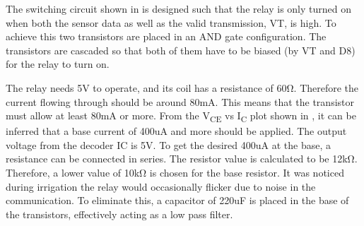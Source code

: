 \vspace*{10pt}
The switching circuit shown in  is designed such that the relay is only turned on when both the sensor data as well as the valid transmission, VT, is high. To achieve this two transistors are placed in an AND gate configuration. The transistors are cascaded so that both of them have to be biased (by VT and D8) for the relay to turn on.
\vspace*{10pt}



The relay needs 5V to operate, and its coil has a resistance of 60Ω. Therefore the current flowing through should be around 80mA. This means that the transistor must allow at least 80mA or more. From the V\textsubscript{CE} vs I\textsubscript{C} plot shown in , it can be inferred that a base current of 400uA and more should be applied. The output voltage from the decoder IC is 5V. To get the desired 400uA at the base, a resistance can be connected in series. The resistor value is calculated to be 12kΩ. Therefore, a lower value of 10kΩ is chosen for the base resistor. It was noticed during irrigation the relay would occasionally flicker due to noise in the communication. To eliminate this, a capacitor of 220uF is placed in the base of the transistors, effectively acting as a low pass filter.